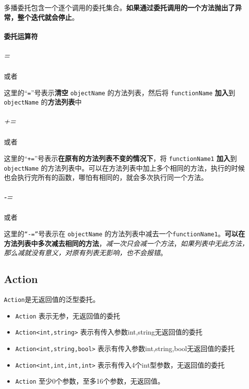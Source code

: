 \documentclass[UTF8,a4paper,12pt]{ctexbook}
\begin{document}
		 	多播委托包含一个逐个调用的委托集合。\textbf{如果通过委托调用的一个方法抛出了异常，整个迭代就会停止}。
		 
		 \paragraph{委托运算符} 
		 	\subparagraph{=}	 
		 		或者 
		 		
		 		这里的“\verb|=|”号表示\textbf{清空} \verb|objectName| 的方法列表，然后将 \verb|functionName| \textbf{加入}到 \verb|objectName| 的\textbf{方法列表}中	 	
		 	
		 	\subparagraph{+=} 	 
		 		或者 
		 			 		
		 		这里的“\verb|+=|”号表示\textbf{在原有的方法列表不变的情况下}，将 \verb|functionName1|  \textbf{加入}到 \verb|objectName| 的方法列表中。可以在方法列表中加上多个相同的方法，执行的时候也会执行完所有的函数，哪怕有相同的，就会多次执行同一个方法。
		 		
		 	\subparagraph{-=}	 
		 		或者 
		 		
		 		这里的\verb|“-=”|号表示在 \verb|objectName| 的方法列表中减去一个\verb|functionName1|。\textbf{可以在方法列表中多次减去相同的方法}，\textit{减一次只会减一个方法}，\textit{如果列表中无此方法，那么减就没有意义，对原有列表无影响，也不会报错}。
		 
		 \subsection{Action}
		 	\verb|Action|是无返回值的泛型委托。
		 	
		 	\begin{itemize}
		 		\item \verb|Action| 表示无参，无返回值的委托
		 		\item \verb|Action<int,string>| 表示有传入参数int,string无返回值的委托
		 		\item \verb|Action<int,string,bool>| 表示有传入参数int,string,bool无返回值的委托
		 		\item \verb|Action<int,int,int,int>| 表示有传入4个int型参数，无返回值的委托
		 		\item \verb|Action| 至少0个参数，至多16个参数，无返回值。
		 	\end{itemize}
		 	
\end{document}
